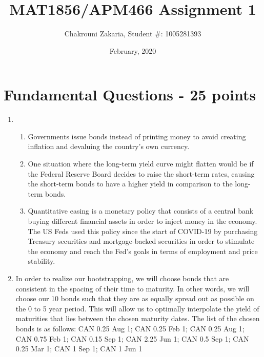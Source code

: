 \documentclass{article}
\title{MAT1856/APM466 Assignment 1}
\author{Chakrouni Zakaria, Student \#: 1005281393}
\date{February, 2020}
\begin{document}
\maketitle

\section*{Fundamental Questions - 25 points}

\begin{enumerate}
    \item \hfill
    \begin{enumerate}
        \item Governments issue bonds instead of printing money to avoid creating inflation and devaluing the country’s own currency.
        \item One situation where the long-term yield curve might flatten would be if the Federal Reserve Board decides to raise the short-term rates, causing the short-term bonds to have a higher yield in comparison to the long-term bonds.
        \item Quantitative easing is a monetary policy that consists of a central bank buying different financial assets in order to inject money in the economy. The US Feds used this policy since the start of COVID-19 by purchasing Treasury securities and mortgage-backed securities in order to stimulate the economy and reach the Fed’s goals in terms of employment and price stability.


    \end{enumerate}
    \item In order to realize our bootstrapping, we will choose bonds that are consistent in the spacing of their time to maturity. In other words, we will choose our 10 bonds such that they are as equally spread out as possible on the 0 to 5 year period. This will allow us to optimally interpolate the yield of maturities that lies between the chosen maturity dates.
    The list of the chosen bonds is as follows:
     CAN 0.25 Aug 1; CAN 0.25 Feb 1; CAN 0.25 Aug 1; CAN 0.75 Feb 1; CAN 0.15 Sep 1; CAN 2.25 Jun 1; CAN 0.5 Sep 1; CAN 0.25 Mar 1; CAN 1 Sep 1; CAN 1 Jun 1


\end{enumerate}
\end{document}
